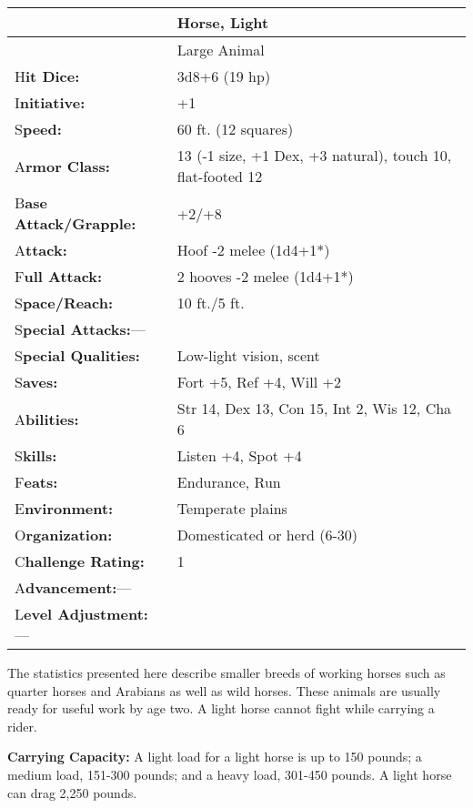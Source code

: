 \documentclass{article}
\begin{document}
\vspace{12pt}
\begin{tabular}{|>{\raggedright}p{91pt}|>{\raggedright}p{226pt}|}
\hline
 & Horse, Light\tabularnewline
\hline
 & Large Animal\tabularnewline
\hline
H\textbf{it Dice:} & 3d8+6 (19 hp)\tabularnewline
\hline
I\textbf{nitiative:} & +1\tabularnewline
\hline
S\textbf{peed:} & 60 ft. (12 squares)\tabularnewline
\hline
A\textbf{rmor Class:} & 13 (-1 size, +1 Dex, +3 natural), touch 10, flat-footed 
12\tabularnewline
\hline
B\textbf{ase Attack/Grapple:} & +2/+8\tabularnewline
\hline
A\textbf{ttack:} & Hoof -2 melee (1d4+1*)\tabularnewline
\hline
F\textbf{ull Attack:} & 2 hooves -2 melee (1d4+1*)\tabularnewline
\hline
S\textbf{pace/Reach:} & 10 ft./5 ft.\tabularnewline
\hline
S\textbf{pecial Attacks:}--- & \tabularnewline
\hline
S\textbf{pecial Qualities:} & Low-light vision, scent\tabularnewline
\hline
S\textbf{aves:} & Fort +5, Ref +4, Will +2\tabularnewline
\hline
A\textbf{bilities:} & Str 14, Dex 13, Con 15, Int 2, Wis 12, Cha 6\tabularnewline
\hline
S\textbf{kills:} & Listen +4, Spot +4\tabularnewline
\hline
F\textbf{eats:} & Endurance, Run\tabularnewline
\hline
E\textbf{nvironment:} & Temperate plains\tabularnewline
\hline
O\textbf{rganization:} & Domesticated or herd (6-30)\tabularnewline
\hline
C\textbf{hallenge Rating:} & 1\tabularnewline
\hline
A\textbf{dvancement:}--- & \tabularnewline
\hline
L\textbf{evel Adjustment:}--- & \tabularnewline
\hline
\end{tabular}

The statistics presented here describe smaller breeds of working horses such as 
quarter horses and Arabians as well as wild horses. These animals are usually ready 
for useful work by age two. A light horse cannot fight while carrying a rider.

\textbf{Carrying Capacity: }A light load for a light horse is up to 150 pounds; 
a medium load, 151-300 pounds; and a heavy load, 301-450 pounds. A light horse 
can drag 2,250 pounds.
\end{document}
